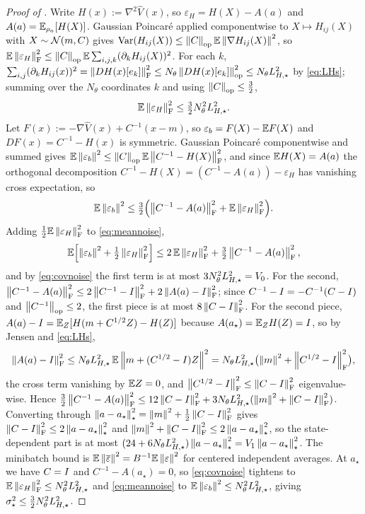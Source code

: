 \begin{proof}[Proof of ]
Write $H(x):=\nabla^2\widehat V(x)$, so $\varepsilon_H=H(X)-A(a)$ and $A(a)=\mathbb{E}_{\rho_a}[H(X)]$.
Gaussian Poincar\'e applied componentwise to $X\mapsto H_{ij}(X)$ with $X\sim\mathcal{N}(m,C)$
gives $\operatorname{Var}(H_{ij}(X))\leq\left\lVert C\right\rVert_{\mathrm{op}}\mathbb{E}\left\lVert \nabla H_{ij}(X)\right\rVert^2$, so
$\mathbb{E}\left\lVert \varepsilon_H\right\rVert_{\mathrm{F}}^2\leq\left\lVert C\right\rVert_{\mathrm{op}}\mathbb{E}\sum_{i,j,k}(\partial_kH_{ij}(X))^2$. For each $k$,
$\sum_{i,j}(\partial_kH_{ij}(x))^2=\left\lVert DH(x)[e_k]\right\rVert_{\mathrm{F}}^2\leq N_\theta\left\lVert DH(x)[e_k]\right\rVert_{\mathrm{op}}^2\leq N_\theta L_{H,\star}^2$
by \eqref{eq:LHs}; summing over the $N_\theta$ coordinates $k$ and using $\left\lVert C\right\rVert_{\mathrm{op}}\leq\tfrac32$,
\begin{equation}
\label{eq:covnoise}
    \mathbb{E}\left\lVert \varepsilon_H\right\rVert_{\mathrm{F}}^2\leq\tfrac32N_\theta^2L_{H,\star}^2 .
\end{equation}
Let $F(x):=-\nabla\widehat V(x)+C^{-1}(x-m)$, so $\varepsilon_b=F(X)-\mathbb{E} F(X)$ and
$DF(x)=C^{-1}-H(x)$ is symmetric. Gaussian Poincar\'e componentwise and summed gives
$\mathbb{E}\left\lVert \varepsilon_b\right\rVert^2\leq\left\lVert C\right\rVert_{\mathrm{op}}\mathbb{E}\left\lVert C^{-1}-H(X)\right\rVert_{\mathrm{F}}^2$, and since $\mathbb{E} H(X)=A(a)$ the
orthogonal decomposition $C^{-1}-H(X)=(C^{-1}-A(a))-\varepsilon_H$ has vanishing cross expectation, so
\begin{equation}
\label{eq:meannoise}
    \mathbb{E}\left\lVert \varepsilon_b\right\rVert^2\leq\tfrac32\Bigl(\left\lVert C^{-1}-A(a)\right\rVert_{\mathrm{F}}^2+\mathbb{E}\left\lVert \varepsilon_H\right\rVert_{\mathrm{F}}^2\Bigr).
\end{equation}
Adding $\tfrac12\mathbb{E}\left\lVert \varepsilon_H\right\rVert_{\mathrm{F}}^2$ to \eqref{eq:meannoise},
\[
    \mathbb{E}\Bigl[\left\lVert \varepsilon_b\right\rVert^2+\tfrac12\left\lVert \varepsilon_H\right\rVert_{\mathrm{F}}^2\Bigr]
    \leq2\,\mathbb{E}\left\lVert \varepsilon_H\right\rVert_{\mathrm{F}}^2+\tfrac32\left\lVert C^{-1}-A(a)\right\rVert_{\mathrm{F}}^2 ,
\]
and by \eqref{eq:covnoise} the first term is at most $3N_\theta^2L_{H,\star}^2=V_0$. For the second,
$\left\lVert C^{-1}-A(a)\right\rVert_{\mathrm{F}}^2\leq2\left\lVert C^{-1}-I\right\rVert_{\mathrm{F}}^2+2\left\lVert A(a)-I\right\rVert_{\mathrm{F}}^2$; since
$C^{-1}-I=-C^{-1}(C-I)$ and $\left\lVert C^{-1}\right\rVert_{\mathrm{op}}\leq2$, the first piece is at most
$8\left\lVert C-I\right\rVert_{\mathrm{F}}^2$. For the second piece, $A(a)-I=\mathbb{E}_Z[H(m+C^{1/2}Z)-H(Z)]$ because
$A(a_\star)=\mathbb{E}_ZH(Z)=I$, so by Jensen and \eqref{eq:LHs},
\[
    \left\lVert A(a)-I\right\rVert_{\mathrm{F}}^2\leq N_\theta L_{H,\star}^2\,\mathbb{E}\left\lVert m+(C^{1/2}-I)Z\right\rVert^2
    =N_\theta L_{H,\star}^2\bigl(\left\lVert m\right\rVert^2+\left\lVert C^{1/2}-I\right\rVert_{\mathrm{F}}^2\bigr),
\]
the cross term vanishing by $\mathbb{E} Z=0$, and $\left\lVert C^{1/2}-I\right\rVert_{\mathrm{F}}^2\leq\left\lVert C-I\right\rVert_{\mathrm{F}}^2$
eigenvalue-wise. Hence
$\tfrac32\left\lVert C^{-1}-A(a)\right\rVert_{\mathrm{F}}^2\leq12\left\lVert C-I\right\rVert_{\mathrm{F}}^2+3N_\theta L_{H,\star}^2(\left\lVert m\right\rVert^2+\left\lVert C-I\right\rVert_{\mathrm{F}}^2)$.
Converting through $\left\lVert a-a_\star\right\rVert_\star^2=\left\lVert m\right\rVert^2+\tfrac12\left\lVert C-I\right\rVert_{\mathrm{F}}^2$ gives
$\left\lVert C-I\right\rVert_{\mathrm{F}}^2\leq2\left\lVert a-a_\star\right\rVert_\star^2$ and
$\left\lVert m\right\rVert^2+\left\lVert C-I\right\rVert_{\mathrm{F}}^2\leq2\left\lVert a-a_\star\right\rVert_\star^2$, so the state-dependent part is at most
$(24+6N_\theta L_{H,\star}^2)\left\lVert a-a_\star\right\rVert_\star^2=V_1\left\lVert a-a_\star\right\rVert_\star^2$. The minibatch bound is
$\mathbb{E}\left\lVert \overline\varepsilon\right\rVert^2=B^{-1}\mathbb{E}\left\lVert \varepsilon\right\rVert^2$ for centered independent averages. At
$a_\star$ we have $C=I$ and $C^{-1}-A(a_\star)=0$, so \eqref{eq:covnoise} tightens to
$\mathbb{E}\left\lVert \varepsilon_H\right\rVert_{\mathrm{F}}^2\leq N_\theta^2L_{H,\star}^2$ and \eqref{eq:meannoise} to
$\mathbb{E}\left\lVert \varepsilon_b\right\rVert^2\leq N_\theta^2L_{H,\star}^2$, giving $\sigma_\star^2\leq\tfrac32N_\theta^2L_{H,\star}^2$.
\end{proof}

